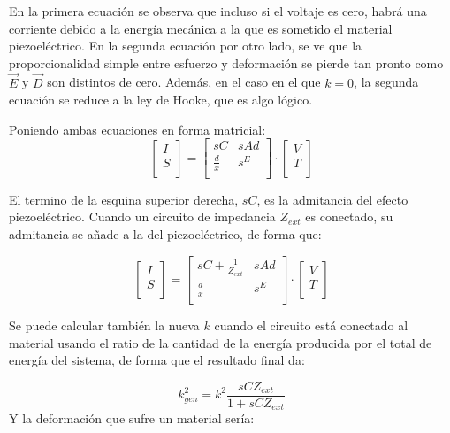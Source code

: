 \documentclass[12pt]{book}
\numberwithin{equation}{section}
\begin{document}
En la primera ecuación se observa que incluso si el voltaje es cero, habrá una corriente debido a la energía mecánica a la que es sometido el material piezoeléctrico. En la segunda ecuación por otro lado, se ve que la proporcionalidad simple entre esfuerzo y deformación se pierde tan pronto como $\vec{E}$ y $\vec{D}$ son distintos de cero. Además, en el caso en el que $k=0$, la segunda ecuación se reduce a la ley de Hooke, que es algo lógico.

Poniendo ambas ecuaciones en forma matricial:
\[
\begin{bmatrix}
I \\
S \\
\end{bmatrix}
=
\begin{bmatrix}
sC & s Ad \\
\frac{d}{x} & s^E \\
\end{bmatrix}
\cdot
\begin{bmatrix}
V \\
T \\
\end{bmatrix}
\]

El termino de la esquina superior derecha, $sC$, es la admitancia del efecto piezoeléctrico. Cuando un circuito de impedancia $Z_{ext}$ es conectado, su admitancia se añade a la del piezoeléctrico, de forma que: 

\[
\begin{bmatrix}
I \\
S \\
\end{bmatrix}
=
\begin{bmatrix}
sC + \frac{1}{Z_{ext}}& s Ad \\
\frac{d}{x} & s^E \\
\end{bmatrix}
\cdot
\begin{bmatrix}
V \\
T \\
\end{bmatrix}
\]

Se puede calcular también la nueva $k$ cuando el circuito está conectado al material usando el ratio de la cantidad de la energía producida por el total de energía del sistema, de forma que el resultado final da:

\begin{equation}
k^2_{gen} = k^2 \frac{sCZ_{ext}}{1+sCZ_{ext}}
\end{equation} 
Y la deformación que sufre un material sería:
\end{document}
